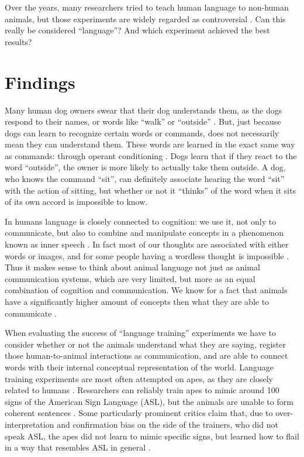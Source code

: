 \documentclass[a4paper,11pt]{article}
\begin{document}
  Over the years, many researchers tried to teach human language to non-human animals,
  but those experiments are widely regarded as controversial \cite{thebook2}.
  Can this really be considered ``language''?
  And which experiment achieved the best results?

  \section{Findings}
  Many human dog owners swear that their dog understands them,
  as the dogs respond to their names, or words like ``walk'' or ``outside'' \cite{jordania2006asked}.
  But, just because dogs can learn to recognize certain words or commands, does not necessarily mean they can understand them.
  These words are learned in the exact same way as commands: through operant conditioning \cite{mckinley2003efficacy}.
  Dogs learn that if they react to the word ``outside'', the owner is more likely to actually take them outside. %
  A dog, who knows the command ``sit'', can definitely associate hearing the word ``sit'' with the action of sitting,
  but whether or not it ``thinks'' of the word when it sits of its own accord is impossible to know.

  In humans language is closely connected to cognition:
  we use it, not only to communicate, but also to combine and manipulate concepts
  in a phenomenon known as inner speech \cite{fitch2020animalcognition}.
  In fact most of our thoughts are associated with either words or images,
  and for some people having a wordless thought is impossible \cite{vicente2016unsymbolized}.
  Thus it makes sense to think about animal language not just as animal communication systems, which are very limited,
  but more as an equal combination of cognition and communication.
  We know for a fact that animals have a significantly higher amount of concepts then what they are able to communicate \cite{fitch2020animalcognition}.

  When evaluating the success of ``language training'' experiments we have to consider whether or not the animals
  understand what they are saying,
  register those human-to-animal interactions as communication,
  and are able to connect words with their internal conceptual representation of the world. %
  Language training experiments are most often attempted on apes, as they are closely related to humans \cite{thebook2}.
  Researchers can reliably train apes to mimic around 100 signs of the American Sign Language (ASL),
  but the animals are unable to form coherent sentences \cite{hungape}.
  Some particularly prominent critics claim that,
  due to over-interpretation and confirmation bias on the side of the trainers, who did not speak ASL,
  the apes did not learn to mimic specific signs,
  but learned how to flail in a way that resembles ASL in general \cite{wynne2007aping}.
\end{document}
